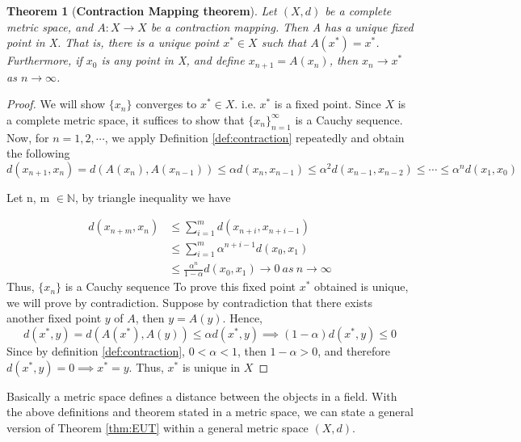 \documentclass{article}
\newtheorem{theorem}{Theorem}[section]
\theoremstyle{definition}
\theoremstyle{remark}
\theoremstyle{example}
\begin{document}
\begin{theorem}[\textbf{Contraction Mapping theorem}]\cite{holmes_chapter_2016}\label{thm:CMT}
    Let $(X,d)$ be a complete metric space, and $A:X\rightarrow X$ be a contraction mapping. Then A has a unique fixed point in X. That is, there is a unique point $x^*\in X$ such that $A(x^*) = x^*$. Furthermore, if $x_0$ is any point in X, and define $x_{n+1} = A(x_n)$, then $x_n \rightarrow x^*$ as $n \rightarrow \infty$.
\end{theorem}

\begin{proof}

    We will show $\{x_n\}$ converges to $x^* \in X$. i.e. $x^*$ is a fixed point. Since $X$ is a complete metric space, it suffices to show that $\{x_n\}_{n = 1}^{\infty}$ is a Cauchy sequence. Now, for $n = 1,2, \cdots$, we apply Definition \ref{def:contraction} repeatedly and obtain the following
        \begin{equation}
            d(x_{n+1},x_n) = d(A(x_n),A(x_{n-1})) \leq \alpha d(x_n,x_{n-1}) \leq \alpha^2 d(x_{n-1},x_{n-2}) \leq \cdots \leq \alpha^n d(x_1,x_0)
        \end{equation}
        
    Let n, m $\in \mathbb{N}$, by triangle inequality we have
    
        \begin{align}
            d(x_{n+m},x_n) &\leq \sum_{i=1}^{m} d(x_{n+i},x_{n+i-1})\\
            &\leq \sum_{i=1}^{m} \alpha^{n+i-1} d(x_0,x_1)\\
            &\leq \frac{\alpha^n}{1-\alpha}d(x_0,x_1) \rightarrow 0  \ as\ n \rightarrow \infty
        \end{align}
    Thus, $\{x_n\}$ is a Cauchy sequence
    To prove this fixed point $x^{*}$ obtained is unique, we will prove by contradiction. Suppose by contradiction that there exists another fixed point $y$ of $A$, then $y = A(y)$. Hence,
    \begin{equation}
        d(x^{*},y) = d(A(x^{*}),A(y)) \leq \alpha d(x^{*},y) \implies (1-\alpha)d(x^{*},y) \leq 0
    \end{equation}
    Since by definition \ref{def:contraction}, $0 < \alpha < 1$, then $1-\alpha > 0$, and therefore $d(x^{*},y) = 0 \implies x^{*} = y$. Thus, $x^{*}$ is unique in $X$
\end{proof}

Basically a metric space defines a distance between the objects in a field. With the above definitions and theorem stated in a metric space, we can state a general version of Theorem \ref{thm:EUT} within a general metric space $(X,d)$. 
\end{document}
